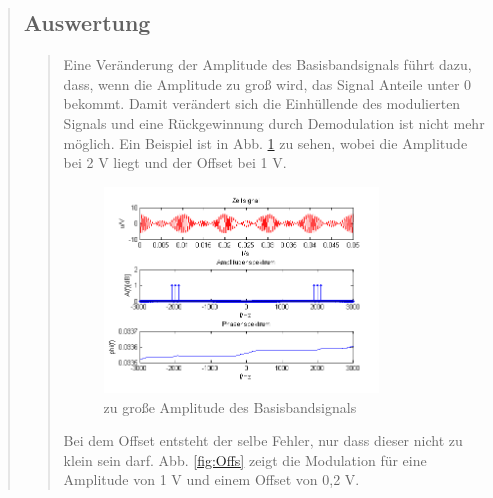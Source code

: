 \begin{quote}
\begin{quote}
    \end{quote}
    
    
    \subsection{Auswertung}
    \begin{quote}
        Eine Veränderung der Amplitude des Basisbandsignals führt dazu, dass,
        wenn die Amplitude zu groß wird, das Signal Anteile unter 0 bekommt.
        Damit verändert sich die Einhüllende des modulierten Signals und eine
        Rückgewinnung durch Demodulation ist nicht mehr möglich. Ein Beispiel
        ist in Abb. \ref{fig:Ampl} zu sehen, wobei die Amplitude bei 2 V liegt
        und der Offset bei 1 V.
        
    \begin{figure}[H]
		\begin{center}
			\includegraphics[width=0.8\textwidth]{Bilder/Cos_zugrosseAmpl}
		\end{center}
		\caption{zu große Amplitude des Basisbandsignals}
		\label{fig:Ampl}
	\end{figure}
	
	Bei dem Offset entsteht der selbe Fehler, nur dass dieser nicht zu klein
        sein darf. Abb. \ref{fig:Offs} zeigt die Modulation für eine Amplitude
        von 1 V und einem Offset von 0,2 V.
	

\end{quote}
\end{quote}
